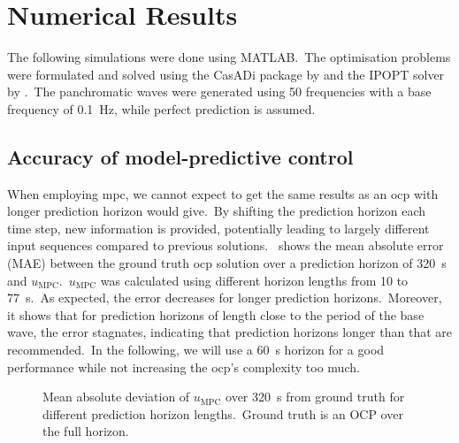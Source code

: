 \section{Numerical Results}

The following simulations were done using MATLAB.\ 
The optimisation problems were formulated and solved using the CasADi package by \cite{Andersson2019casadi} and the IPOPT solver by \cite{Waechter2006ipopt}.\
The panchromatic waves were generated using 50 frequencies with a base frequency of \SI{0.1}{\hertz}, while perfect prediction is assumed.\ 

\subsection{Accuracy of model-predictive control}
When employing \ac{mpc}, we cannot expect to get the same results as an \ac{ocp} with longer prediction horizon would give.\ 
By shifting the prediction horizon each time step, new information is provided, potentially leading to largely different input sequences compared to previous solutions.\
 shows the mean absolute error (MAE) between the ground truth \ac{ocp} solution over a prediction horizon of \SI{320}{\second} and $u_\mathrm{MPC}$.\ 
$u_\mathrm{MPC}$ was calculated using different horizon lengths from 10 to \SI{77}{\second}.\
As expected, the error decreases for longer prediction horizons.\ 
Moreover, it shows that for prediction horizons of length close to the period of the base wave, the error stagnates, indicating that prediction horizons longer than that are recommended.\ 
In the following, we will use a \SI{60}{\second} horizon for a good performance while not increasing the \ac{ocp}'s complexity too much.
\begin{figure}[htb]
	\centering
	\fontsize{8}{0}\selectfont
	\def\svgwidth{0.47\textwidth}
	
	\caption{Mean absolute deviation of $u_\mathrm{MPC}$ over \SI{320}{\second} from ground truth for different prediction horizon lengths.\ Ground truth is an OCP over the full horizon.}
	\label{fig:mpc_error}
\end{figure}

